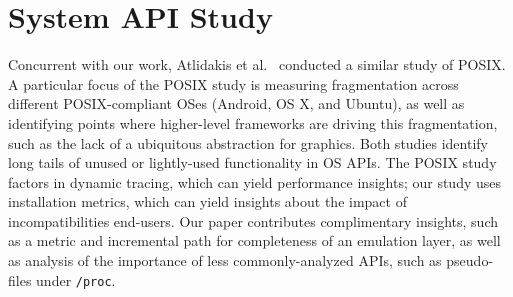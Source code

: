 \section{System API Study}


Concurrent with our work, Atlidakis et al.~\citep{atlidakis16posix} conducted a similar 
study of POSIX.
A particular focus of the POSIX study is measuring fragmentation across different POSIX-compliant OSes
(Android, OS X, and Ubuntu), as well as identifying points where higher-level frameworks
are driving this fragmentation, such as the lack of a ubiquitous abstraction for graphics.
Both studies identify long tails of unused or lightly-used functionality in OS APIs.
The POSIX study factors in dynamic tracing, which can yield performance insights;
our study uses installation metrics, which can yield insights about the impact of incompatibilities end-users.
Our paper contributes complimentary insights, such as a metric and incremental path for 
completeness of an emulation layer, as well as analysis of the importance of less commonly-analyzed 
APIs, such as pseudo-files under {\tt /proc}.



